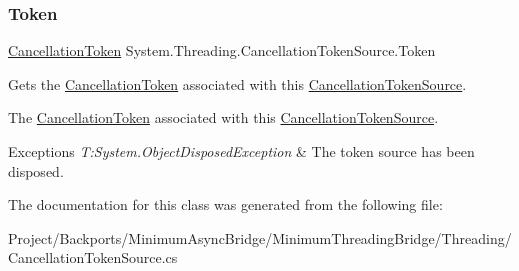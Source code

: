 \subsubsection{\texorpdfstring{Token}{Token}}
{\footnotesize\ttfamily \hyperlink{struct_system_1_1_threading_1_1_cancellation_token}{Cancellation\+Token} System.\+Threading.\+Cancellation\+Token\+Source.\+Token\hspace{0.3cm}{\ttfamily [get]}}



Gets the \hyperlink{struct_system_1_1_threading_1_1_cancellation_token}{Cancellation\+Token} associated with this \hyperlink{class_system_1_1_threading_1_1_cancellation_token_source}{Cancellation\+Token\+Source}. 

The \hyperlink{struct_system_1_1_threading_1_1_cancellation_token}{Cancellation\+Token} associated with this \hyperlink{class_system_1_1_threading_1_1_cancellation_token_source}{Cancellation\+Token\+Source}.


\begin{DoxyExceptions}{Exceptions}
{\em T\+:\+System.\+Object\+Disposed\+Exception} & The token source has been disposed.\\
\hline
\end{DoxyExceptions}


The documentation for this class was generated from the following file\+:\begin{DoxyCompactItemize}
\item 
Project/\+Backports/\+Minimum\+Async\+Bridge/\+Minimum\+Threading\+Bridge/\+Threading/Cancellation\+Token\+Source.\+cs\end{DoxyCompactItemize}
